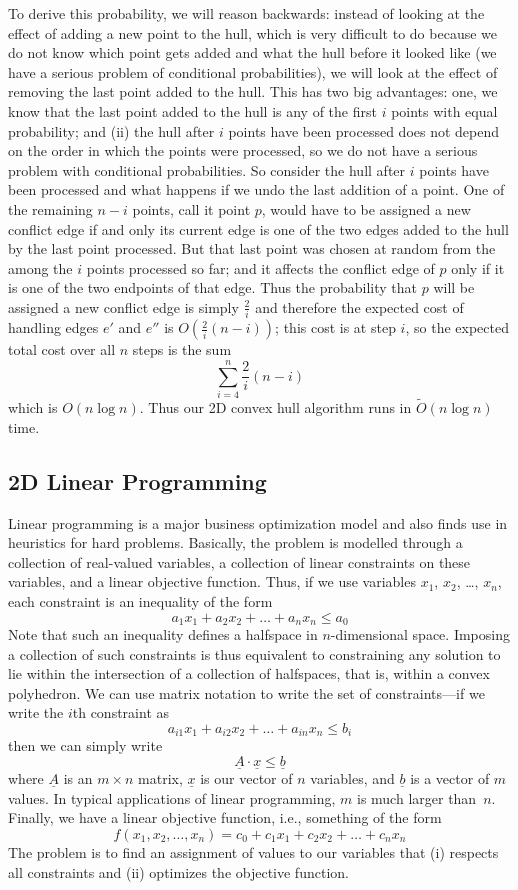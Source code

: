 \documentclass[11pt]{article}
\begin{document}
To derive this probability, we will reason backwards: instead of looking
at the effect of adding a new point to the hull, which is very difficult
to do because we do not know which point gets added and what the hull before
it looked like (we have a serious problem of conditional probabilities),
we will look at the effect of removing the last point added to the hull.
This has two big advantages: one, we know that the last point added to the
hull is any of the first $i$ points with equal probability; and (ii) the
hull after $i$ points have been processed does not depend on the order
in which the points were processed, so we do not have a serious problem
with conditional probabilities.  So consider the hull after $i$ points have
been processed and what happens if we undo the last addition of a point.
One of the remaining $n-i$ points, call it point $p$, would have to be
assigned a new conflict edge if and only its current edge is one of the
two edges added to the hull by the last point processed.
But that last point was chosen at random from the among the $i$ points
processed so far;
and it affects the conflict edge of $p$ only if it is one of the two
endpoints of that edge.  Thus the probability that $p$ will be assigned
a new conflict edge is simply $\frac{2}{i}$ and therefore the expected
cost of handling edges $e'$ and $e''$ is $O(\frac{2}{i}(n-i))$; this
cost is at step $i$, so the expected total cost over all $n$ steps is
the sum
  $$\sum_{i=4}^n \frac{2}{i}(n-i)$$
which is $O(n\log n)$.  Thus our 2D convex hull algorithm runs in
$\tilde{O}(n\log n)$ time.
 
\subsection{2D Linear Programming}
Linear programming is a major business optimization model and also finds
use in heuristics for hard problems.   Basically, the problem is modelled
through a collection of real-valued variables, a collection of linear
constraints on these variables, and a linear objective function.
Thus, if we use variables $x_1$, $x_2$, \dots, $x_n$, each constraint is
an inequality of the form
  $$a_1 x_1 + a_2 x_2 + \dots + a_n x_n \leq a_0$$
Note that such an inequality defines a halfspace in $n$-dimensional space.
Imposing a collection of such constraints is thus equivalent to constraining
any solution to lie within the intersection of a collection of halfspaces,
that is, within a convex polyhedron.  We can use matrix notation to write
the set of constraints---if we write the $i$th constraint as
  $$a_{i1} x_1 + a_{i2} x_2 + \ldots + a_{in} x_n \leq b_i$$
then we can simply write
  $$\underline{A}\cdot\underline{x}\leq\underline{b}$$
where $\underline{A}$ is an $m\times n$ matrix, $\underline{x}$ is our
vector of $n$ variables, and $\underline{b}$ is a vector of $m$ values.
In typical applications of linear programming, $m$ is much larger than~$n$.
Finally, we have a linear objective function, i.e., something of the form
 $$f(x_1,x_2,\ldots,x_n) = c_0 + c_1 x_1 + c_2 x_2 + \ldots + c_n x_n$$
The problem is to find an assignment of values to our variables that
(i) respects all constraints and (ii) optimizes the objective function.
\end{document}
